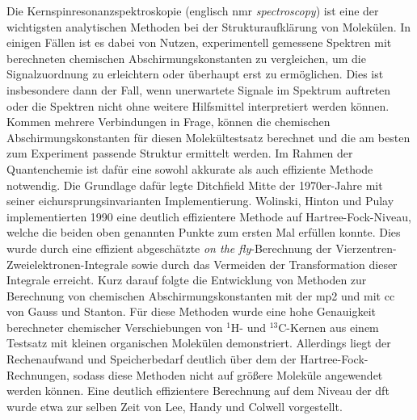 Die Kernspinresonanzspektroskopie (englisch \ac{nmr} \textit{spectroscopy}) ist eine der wichtigsten analytischen Methoden bei der Strukturaufklärung von Molekülen. In einigen Fällen ist es dabei von Nutzen, experimentell gemessene Spektren mit berechneten chemischen Abschirmungskonstanten zu vergleichen, um die Signalzuordnung zu erleichtern oder überhaupt erst zu ermöglichen. Dies ist insbesondere dann der Fall, wenn unerwartete Signale im Spektrum auftreten oder die Spektren nicht ohne weitere Hilfsmittel interpretiert werden können. Kommen mehrere Verbindungen in Frage, können die chemischen Abschirmungskonstanten für diesen Molekültestsatz berechnet und die am besten zum Experiment passende Struktur ermittelt werden. Im Rahmen der Quantenchemie ist dafür eine sowohl akkurate als auch effiziente Methode notwendig. Die Grundlage dafür legte Ditchfield\supercite{ditchfield1974self} Mitte der 1970er-Jahre mit seiner eichursprungsinvarianten Implementierung. Wolinski, Hinton und Pulay\supercite{wolinski1990efficient} implementierten 1990 eine deutlich effizientere Methode auf Hartree-Fock-Niveau, welche die beiden oben genannten Punkte zum ersten Mal erfüllen konnte. Dies wurde durch eine effizient abgeschätzte \glqq \textit{on the fly}\grqq{}-Berechnung der Vierzentren-Zweielektronen-Integrale sowie durch das Vermeiden der Transformation dieser Integrale erreicht. Kurz darauf folgte die Entwicklung von Methoden zur Berechnung von chemischen Abschirmungskonstanten mit der \ac{mp2}\supercite{gauss1992calculation} und mit \ac{cc}\supercite{gauss1995gauge} von Gauss und Stanton. Für diese Methoden wurde eine hohe Genauigkeit berechneter chemischer Verschiebungen von $^1$H- und $^{13}$C-Kernen aus einem Testsatz mit kleinen organischen Molekülen demonstriert. Allerdings liegt der Rechenaufwand und Speicherbedarf deutlich über dem der Hartree-Fock-Rechnungen, sodass diese Methoden nicht auf größere Moleküle angewendet werden können. Eine deutlich effizientere Berechnung auf dem Niveau der \ac{dft} wurde etwa zur selben Zeit von Lee, Handy und Colwell\supercite{lee1995density} vorgestellt. 

